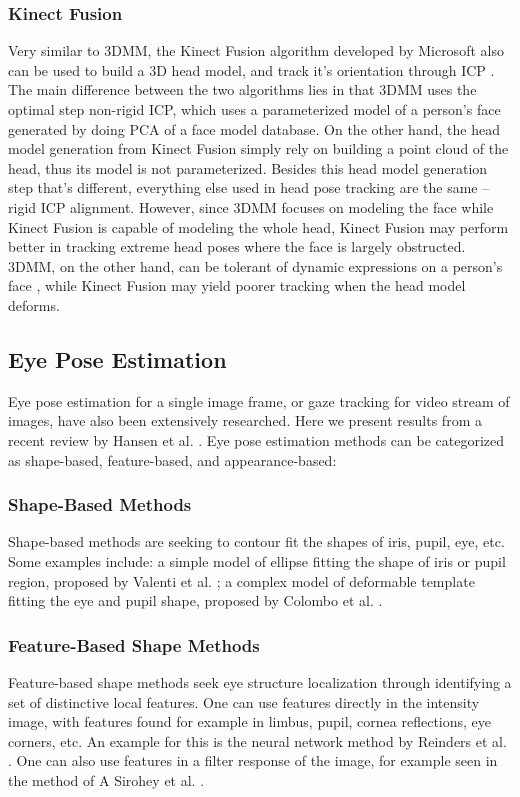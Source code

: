 \documentclass{ut-thesis}
\begin{document}
\subsubsection{Kinect Fusion}
Very similar to 3DMM, the Kinect Fusion algorithm developed by Microsoft also can be used to build a 3D head model, and track it's orientation through ICP \cite{newcombe2011kinectfusion}.  The main difference between the two algorithms lies in that 3DMM uses the optimal step non-rigid ICP, which uses a parameterized model of a person's face generated by doing PCA of a face model database.  On the other hand, the head model generation from Kinect Fusion simply rely on building a point cloud of the head, thus its model is not parameterized.  Besides this head model generation step that's different, everything else used in head pose tracking are the same -- rigid ICP alignment.  However, since 3DMM focuses on modeling the face while Kinect Fusion is capable of modeling the whole head, Kinect Fusion may perform better in tracking extreme head poses where the face is largely obstructed.  3DMM, on the other hand, can be tolerant of dynamic expressions on a person's face \cite{amberg2008expression}, while Kinect Fusion may yield poorer tracking when the head model deforms.

\subsection{Eye Pose Estimation}
Eye pose estimation for a single image frame, or gaze tracking for video stream of images, have also been extensively researched.  Here we present results from a recent review by Hansen et al. \cite{hansen2010eye}.  Eye pose estimation methods can be categorized as shape-based, feature-based, and appearance-based:


\subsubsection{Shape-Based Methods}
Shape-based methods are seeking to contour fit the shapes of iris, pupil, eye, etc.  Some examples include: a simple model of ellipse fitting the shape of iris or pupil region, proposed by Valenti et al. \cite{valenti2008accurate}; a complex model of deformable template fitting the eye and pupil shape, proposed by Colombo et al. \cite{colombo1999real}.


\subsubsection{Feature-Based Shape Methods}
Feature-based shape methods seek eye structure localization through identifying a set of distinctive local features.  One can use features directly in the intensity image, with features found for example in limbus, pupil, cornea reflections, eye corners, etc.  An example for this is the neural network method by Reinders et al. \cite{reinders1996locating}.  One can also use features in a filter response of the image, for example seen in the method of A Sirohey et al. \cite{sirohey2001eye}.
\end{document}

